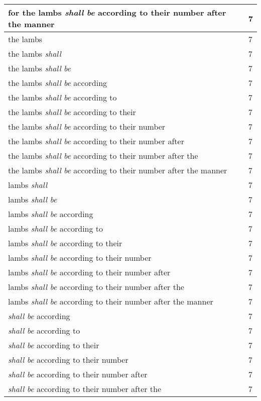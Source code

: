 \begin{center}
\begin{longtable}{|p{3.0in}|p{0.5in}|}
for the lambs \emph{shall} \emph{be} according to their number after the manner & 7\\ \hline 
the lambs & 7\\ \hline 
the lambs \emph{shall} & 7\\ \hline 
the lambs \emph{shall} \emph{be} & 7\\ \hline 
the lambs \emph{shall} \emph{be} according & 7\\ \hline 
the lambs \emph{shall} \emph{be} according to & 7\\ \hline 
the lambs \emph{shall} \emph{be} according to their & 7\\ \hline 
the lambs \emph{shall} \emph{be} according to their number & 7\\ \hline 
the lambs \emph{shall} \emph{be} according to their number after & 7\\ \hline 
the lambs \emph{shall} \emph{be} according to their number after the & 7\\ \hline 
the lambs \emph{shall} \emph{be} according to their number after the manner & 7\\ \hline 
lambs \emph{shall} & 7\\ \hline 
lambs \emph{shall} \emph{be} & 7\\ \hline 
lambs \emph{shall} \emph{be} according & 7\\ \hline 
lambs \emph{shall} \emph{be} according to & 7\\ \hline 
lambs \emph{shall} \emph{be} according to their & 7\\ \hline 
lambs \emph{shall} \emph{be} according to their number & 7\\ \hline 
lambs \emph{shall} \emph{be} according to their number after & 7\\ \hline 
lambs \emph{shall} \emph{be} according to their number after the & 7\\ \hline 
lambs \emph{shall} \emph{be} according to their number after the manner & 7\\ \hline 
\emph{shall} \emph{be} according & 7\\ \hline 
\emph{shall} \emph{be} according to & 7\\ \hline 
\emph{shall} \emph{be} according to their & 7\\ \hline 
\emph{shall} \emph{be} according to their number & 7\\ \hline 
\emph{shall} \emph{be} according to their number after & 7\\ \hline 
\emph{shall} \emph{be} according to their number after the & 7\\ \hline 

\end{longtable}
\end{center}
